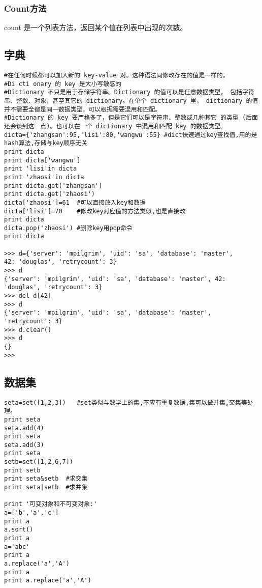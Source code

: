 \documentclass[twoside,11pt]{book}
\begin{document}
\subsubsection{Count方法}
count 是一个列表方法，返回某个值在列表中出现的次数。

\subsection{字典}
\begin{lstlisting}
#在任何时候都可以加入新的 key-value 对。这种语法同修改存在的值是一样的。
#Di cti onary 的 key 是大小写敏感的
#Dictionary 不只是用于存储字符串。Dictionary 的值可以是任意数据类型， 包括字符串、整数、对象，甚至其它的 dictionary。在单个 dictionary 里， dictionary 的值并不需要全都是同一数据类型，可以根据需要混用和匹配。
#Dictionary 的 key 要严格多了，但是它们可以是字符串、整数或几种其它 的类型 (后面还会谈到这一点)。也可以在一个 dictionary 中混用和匹配 key 的数据类型。
dicta={'zhangsan':95,'lisi':80,'wangwu':55} #dict快速通过key查找值,用的是hash算法,存储与key顺序无关
print dicta
print dicta['wangwu']
print 'lisi'in dicta
print 'zhaosi'in dicta
print dicta.get('zhangsan')
print dicta.get('zhaosi')
dicta['zhaosi']=61  #可以直接放入key和数据
dicta['lisi']=70    #修改key对应值的方法类似,也是直接改
print dicta
dicta.pop('zhaosi') #删除key用pop命令
print dicta

>>> d={'server': 'mpilgrim', 'uid': 'sa', 'database': 'master',
42: 'douglas', 'retrycount': 3}
>>> d
{'server': 'mpilgrim', 'uid': 'sa', 'database': 'master', 42: 'douglas', 'retrycount': 3}
>>> del d[42]
>>> d
{'server': 'mpilgrim', 'uid': 'sa', 'database': 'master', 'retrycount': 3}
>>> d.clear()
>>> d
{}
>>>
\end{lstlisting}

\subsection{数据集}

\begin{lstlisting}
seta=set([1,2,3])   #set类似与数学上的集,不应有重复数据,集可以做并集,交集等处理。
print seta
seta.add(4)
print seta
seta.add(3)
print seta
setb=set([1,2,6,7])
print setb
print seta&setb  #求交集
print seta|setb  #求并集

print '可变对象和不可变对象:'
a=['b','a','c']
print a
a.sort()
print a
a='abc'
print a
a.replace('a','A')
print a
print a.replace('a','A')

\end{lstlisting}
\end{document}
